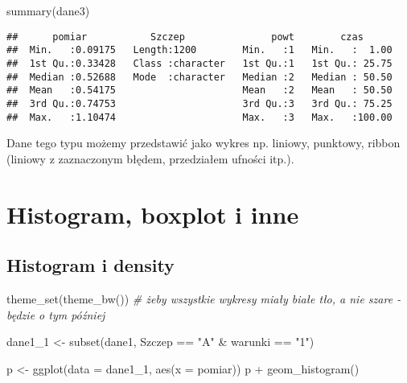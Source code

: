 \documentclass[
]{book}
\newenvironment{Shaded}{\begin{snugshade}}{\end{snugshade}}
\newcommand{\AttributeTok}[1]{\textcolor[rgb]{0.77,0.63,0.00}{#1}}
\newcommand{\CommentTok}[1]{\textcolor[rgb]{0.56,0.35,0.01}{\textit{#1}}}
\newcommand{\FunctionTok}[1]{\textcolor[rgb]{0.00,0.00,0.00}{#1}}
\newcommand{\NormalTok}[1]{#1}
\newcommand{\OtherTok}[1]{\textcolor[rgb]{0.56,0.35,0.01}{#1}}
\newcommand{\SpecialCharTok}[1]{\textcolor[rgb]{0.00,0.00,0.00}{#1}}
\newcommand{\StringTok}[1]{\textcolor[rgb]{0.31,0.60,0.02}{#1}}
\begin{document}
\begin{Shaded}
\begin{Highlighting}[]
\FunctionTok{summary}\NormalTok{(dane3)}
\end{Highlighting}
\end{Shaded}

\begin{verbatim}
##      pomiar           Szczep               powt        czas       
##  Min.   :0.09175   Length:1200        Min.   :1   Min.   :  1.00  
##  1st Qu.:0.33428   Class :character   1st Qu.:1   1st Qu.: 25.75  
##  Median :0.52688   Mode  :character   Median :2   Median : 50.50  
##  Mean   :0.54175                      Mean   :2   Mean   : 50.50  
##  3rd Qu.:0.74753                      3rd Qu.:3   3rd Qu.: 75.25  
##  Max.   :1.10474                      Max.   :3   Max.   :100.00
\end{verbatim}

Dane tego typu możemy przedstawić jako wykres np. liniowy, punktowy, ribbon (liniowy z zaznaczonym błędem, przedziałem ufności itp.).

\hypertarget{histogram-boxplot-i-inne}{%
\section{Histogram, boxplot i inne}\label{histogram-boxplot-i-inne}}

\hypertarget{histogram-i-density}{%
\subsection{Histogram i density}\label{histogram-i-density}}

\begin{Shaded}
\begin{Highlighting}[]
\FunctionTok{theme\_set}\NormalTok{(}\FunctionTok{theme\_bw}\NormalTok{()) }\CommentTok{\# żeby wszystkie wykresy miały białe tło, a nie szare {-} będzie o tym później}

\NormalTok{dane1\_1 }\OtherTok{\textless{}{-}} \FunctionTok{subset}\NormalTok{(dane1, Szczep }\SpecialCharTok{==} \StringTok{"A"} \SpecialCharTok{\&}\NormalTok{ warunki }\SpecialCharTok{==} \StringTok{"1"}\NormalTok{)}

\NormalTok{p }\OtherTok{\textless{}{-}} \FunctionTok{ggplot}\NormalTok{(}\AttributeTok{data =}\NormalTok{ dane1\_1, }\FunctionTok{aes}\NormalTok{(}\AttributeTok{x =}\NormalTok{ pomiar))}
\NormalTok{p }\SpecialCharTok{+} \FunctionTok{geom\_histogram}\NormalTok{()}
\end{Highlighting}
\end{Shaded}
\end{document}

